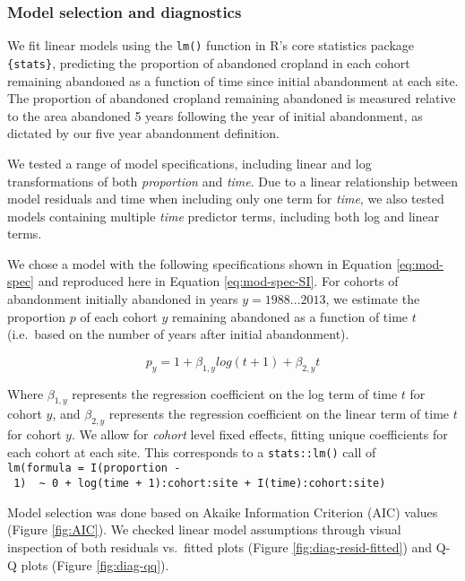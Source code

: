 \documentclass[9pt,twoside,lineno]{pnas-new}
\begin{document}
\hypertarget{model-selection-and-diagnostics}{%
\subsubsection{Model selection and diagnostics}\label{model-selection-and-diagnostics}}

We fit linear models using the \texttt{lm()} function in R's core statistics package \texttt{\{stats\}}, predicting the proportion of abandoned cropland in each cohort remaining abandoned as a function of time since initial abandonment at each site.
The proportion of abandoned cropland remaining abandoned is measured relative to the area abandoned 5 years following the year of initial abandonment, as dictated by our five year abandonment definition.

We tested a range of model specifications, including linear and log transformations of both \emph{proportion} and \emph{time}.
Due to a linear relationship between model residuals and time when including only one term for \emph{time}, we also tested models containing multiple \emph{time} predictor terms, including both log and linear terms.

We chose a model with the following specifications shown in Equation \eqref{eq:mod-spec} and reproduced here in Equation \eqref{eq:mod-spec-SI}.
For cohorts of abandonment initially abandoned in years \(y = 1988 ... 2013\), we estimate the proportion \(p\) of each cohort \(y\) remaining abandoned as a function of time \(t\) (i.e.~based on the number of years after initial abandonment).

\begin{equation}
p_{y} = 1 + \beta_{1,y} log(t + 1) + \beta_{2,y} t \label{eq:mod-spec-SI}
\end{equation}

Where \(\beta_{1,y}\) represents the regression coefficient on the log term of time \(t\) for cohort \(y\), and \(\beta_{2,y}\) represents the regression coefficient on the linear term of time \(t\) for cohort \(y\).
We allow for \emph{cohort} level fixed effects, fitting unique coefficients for each cohort at each site.
This corresponds to a \texttt{stats::lm()} call of \texttt{lm(formula\ =\ I(proportion\ -\ 1)\ \ \textasciitilde{}\ 0\ +\ log(time\ +\ 1):cohort:site\ +\ I(time):cohort:site)}

Model selection was done based on Akaike Information Criterion (AIC) values (Figure \ref{fig:AIC}).
We checked linear model assumptions through visual inspection of both residuals vs.~fitted plots (Figure \ref{fig:diag-resid-fitted}) and Q-Q plots (Figure \ref{fig:diag-qq}).
\end{document}
